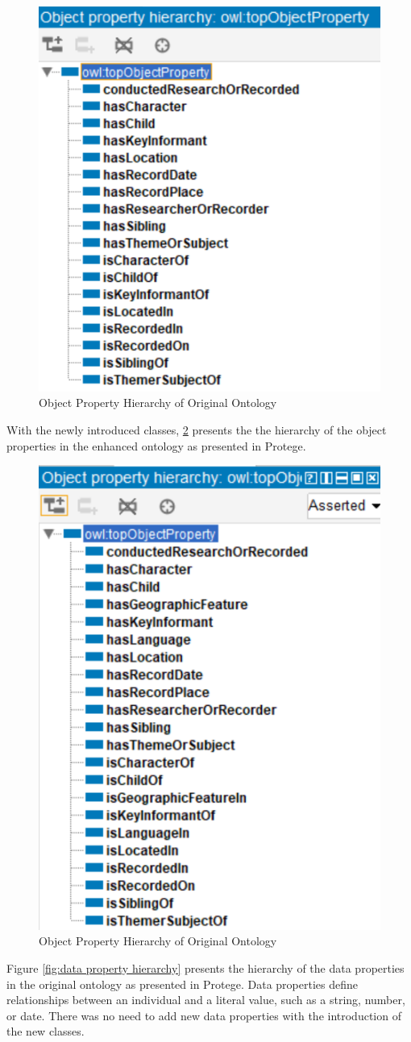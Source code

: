 \begin{figure}[H]
    \centering
    \includegraphics[width=0.5\linewidth]{figures/Object Property Hierarchy of Original Ontology.png}
    \caption{Object Property Hierarchy of Original Ontology}
    \label{fig:object property hierarchy}
\end{figure}

With the newly introduced classes, \ref{fig:object property hierarchy enhanced} presents the the hierarchy of the object properties in the enhanced ontology as presented in Protege.

\begin{figure}[H]
    \centering
    \includegraphics[width=0.5\linewidth]{figures/Object Property Hierarchy of Enhanced Ontology.png}
    \caption{Object Property Hierarchy of Original Ontology}
    \label{fig:object property hierarchy enhanced}
\end{figure}

Figure \ref{fig:data property hierarchy} presents the hierarchy of the data properties in the original ontology as presented in Protege. Data properties define relationships between an individual and a literal value, such as a string, number, or date. There was no need to add new data properties with the introduction of the new classes.

